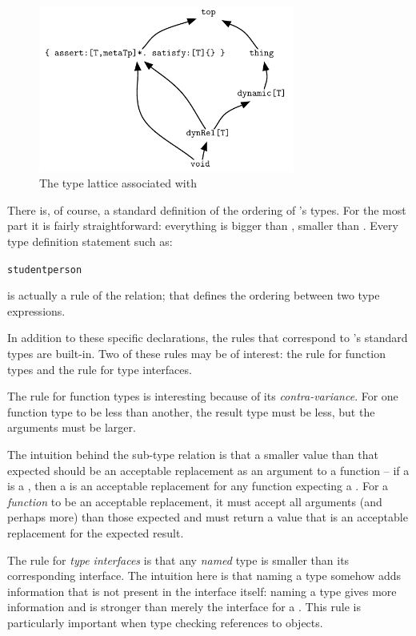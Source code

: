 \begin{figure}
\centerline{\includegraphics[width=0.75\textwidth]{dynrel}}
\caption{\label{type:dynrel}The type lattice associated with }
\end{figure}

There is, of course, a standard definition of the ordering of \go's types. For the most part it is fairly straightforward: everything is bigger than , smaller than . Every type definition statement such as:
\begin{alltt}
student \typearrow person
\end{alltt}
is actually a rule of the \q{\typearrow} relation; that defines the ordering between two type expressions.

In addition to these specific declarations, the rules that correspond to \go's standard types are built-in. Two of these rules may be of interest: the rule for function types and the rule for type interfaces.

The rule for function types is interesting because of its \emph{contra-vari\-ance}. For one function type to be less than another, the result type must be less, but the arguments must be larger.

The intuition behind the sub-type relation is that a smaller value than that expected should be an acceptable replacement as an argument to a function -- if a  is a , then a  is an acceptable replacement for any function expecting a . For a \emph{function} to be an acceptable replacement, it must accept all arguments (and perhaps more) than those expected and must return a value that is an acceptable replacement for the expected result.

The rule for \emph{type interfaces} is that any \emph{named} type is smaller than its corresponding interface. The intuition here is that naming a type somehow adds information that is not present in the interface itself: naming a  type gives more information and is stronger than merely the interface for a . This rule is particularly important when type checking references to objects.

